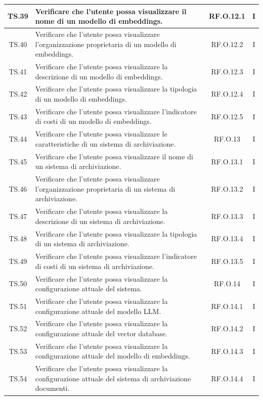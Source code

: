 \begin{xltabular}{\textwidth}{|c|X|c|c|}
\hline
TS.39 & Verificare che l'utente possa visualizzare il nome di un modello di embeddings. & RF.O.12.1 & I \\
\hline
TS.40 & Verificare che l'utente possa visualizzare l’organizzazione proprietaria di un modello di embeddings. & RF.O.12.2 & I \\
\hline
TS.41 & Verificare che l'utente possa visualizzare la descrizione di un modello di embeddings. & RF.O.12.3 & I \\
\hline
TS.42 & Verificare che l'utente possa visualizzare la tipologia di un modello di embeddings. & RF.O.12.4 & I \\
\hline
TS.43 & Verificare che l'utente possa visualizzare l’indicatore di costi di un modello di embeddings. & RF.O.12.5 & I \\
\hline
TS.44 & Verificare che l'utente possa visualizzare le caratteristiche di un sistema di archiviazione. & RF.O.13 & I \\
\hline
TS.45 & Verificare che l'utente possa visualizzare il nome di un sistema di archiviazione. & RF.O.13.1 & I \\
\hline
TS.46 & Verificare che l'utente possa visualizzare l’organizzazione proprietaria di un sistema di archiviazione. & RF.O.13.2 & I \\
\hline
TS.47 & Verificare che l'utente possa visualizzare la descrizione di un sistema di archiviazione. & RF.O.13.3 & I \\
\hline
TS.48 & Verificare che l'utente possa visualizzare la tipologia di un sistema di archiviazione. & RF.O.13.4 & I \\
\hline
TS.49 & Verificare che l'utente possa visualizzare l’indicatore di costi di un sistema di archiviazione. & RF.O.13.5 & I \\
\hline
TS.50 & Verificare che l'utente possa visualizzare la configurazione attuale del sistema. & RF.O.14 & I \\
\hline
TS.51 & Verificare che l'utente possa visualizzare la configurazione attuale del modello LLM. & RF.O.14.1 & I \\
\hline
TS.52 & Verificare che l'utente possa visualizzare la configurazione attuale del vector database. & RF.O.14.2 & I \\
\hline
TS.53 & Verificare che l'utente possa visualizzare la configurazione attuale del modello di embeddings. & RF.O.14.3 & I \\
\hline
TS.54 & Verificare che l'utente possa visualizzare la configurazione attuale del sistema di archiviazione documenti. & RF.O.14.4 & I \\

\end{xltabular}
